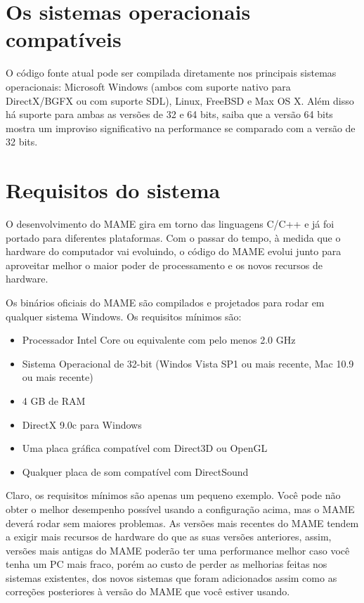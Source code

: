 \documentclass[letterpaper,10pt,brazil]{sphinxmanual}
\begin{document}
\section{Os sistemas operacionais compatíveis}
\label{initialsetup/mameintro:os-sistemas-operacionais-compativeis}
O código fonte atual pode ser compilada diretamente nos principais
sistemas operacionais: Microsoft Windows (ambos com suporte nativo para
DirectX/BGFX ou com suporte SDL), Linux, FreeBSD e Max OS X. Além disso
há suporte para ambas as versões de 32 e 64 bits, saiba que a versão
64 bits mostra um improviso significativo na performance se comparado
com a versão de 32 bits.


\section{Requisitos do sistema}
\label{initialsetup/mameintro:requisitos-do-sistema}
O desenvolvimento do MAME gira em torno das linguagens C/C++ e já foi
portado para diferentes plataformas. Com o passar do tempo, à medida que
o hardware do computador vai evoluindo, o código do MAME evolui junto
para aproveitar melhor o maior poder de processamento e os novos
recursos de hardware.

Os binários oficiais do MAME são compilados e projetados para rodar em
qualquer sistema Windows. Os requisitos mínimos são:
\begin{itemize}
\item {} 
Processador Intel Core ou equivalente com pelo menos 2.0 GHz

\item {} 
Sistema Operacional de 32-bit (Windos Vista SP1 ou mais recente, Mac
10.9 ou mais recente)

\item {} 
4 GB de RAM

\item {} 
DirectX 9.0c para Windows

\item {} 
Uma placa gráfica compatível com Direct3D ou OpenGL

\item {} 
Qualquer placa de som compatível com DirectSound

\end{itemize}

Claro, os requisitos mínimos são apenas um pequeno exemplo. Você pode
não obter o melhor desempenho possível usando a configuração acima, mas
o MAME deverá rodar sem maiores problemas. As versões mais recentes do
MAME tendem a exigir mais recursos de hardware do que as suas versões
anteriores, assim, versões mais antigas do MAME poderão ter uma
performance melhor caso você tenha um PC mais fraco, porém ao custo de
perder as melhorias feitas nos sistemas existentes, dos novos sistemas
que foram adicionados assim como as correções posteriores à versão do
MAME que você estiver usando.
\end{document}

